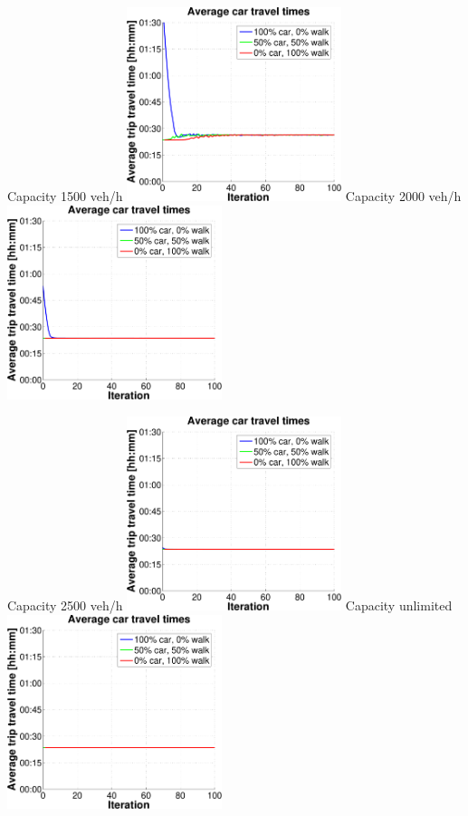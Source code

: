 {  \createsubfigure%
  {Capacity 1500 veh/h}%
  {\includegraphics[width=0.47\textwidth, angle=0, trim=0mm 0mm 0mm 9mm, clip=true]{extending/figures/MultiModalSimulation/simulations/avg_car_traveltime_1500}}%
  {\label{}}%
  {\hspace{3mm}}%
  \createsubfigure%
  {Capacity 2000 veh/h}%
  {\includegraphics[width=0.47\textwidth, angle=0, trim=0mm 0mm 0mm 9mm, clip=true]{extending/figures/MultiModalSimulation/simulations/avg_car_traveltime_2000}}%
  {\label{}}%
  {\vspace{7.5mm}}%

  \createsubfigure%
  {Capacity 2500 veh/h}%
  {\includegraphics[width=0.47\textwidth, angle=0, trim=0mm 0mm 0mm 9mm, clip=true]{extending/figures/MultiModalSimulation/simulations/avg_car_traveltime_2500}}%
  {\label{}}%
  {\hspace{3mm}}%
  \createsubfigure%
  {Capacity unlimited}%
  {\includegraphics[width=0.47\textwidth, angle=0, trim=0mm 0mm 0mm 9mm, clip=true]{extending/figures/MultiModalSimulation/simulations/avg_car_traveltime_unlimited}}%
  {\label{}}%
  {}%
}%
